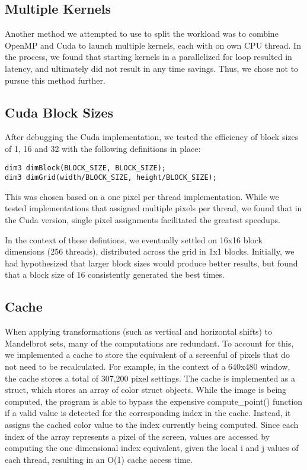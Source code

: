 \documentclass{article}
\begin{document}
\subsection{Multiple Kernels}

Another method we attempted to use to split the workload was to combine OpenMP and Cuda to launch multiple kernels, each with on own CPU thread. In the process, we found that starting kernels in a parallelized for loop resulted in latency, and ultimately did not result in any time savings. Thus, we chose not to pursue this method further.

\subsection{Cuda Block Sizes}

After debugging the Cuda implementation, we tested the efficiency of block sizes of 1, 16 and 32 with the following definitions in place: 

\begin{verbatim}
dim3 dimBlock(BLOCK_SIZE, BLOCK_SIZE); 
dim3 dimGrid(width/BLOCK_SIZE, height/BLOCK_SIZE);
\end{verbatim}

This was chosen based on a one pixel per thread implementation. While we tested implementations that assigned multiple pixels per thread, we found that in the Cuda version, single pixel assignments facilitated the greatest speedups. 

In the context of these defintions, we eventually settled on 16x16 block dimensions (256 threads), distributed across the grid in 1x1 blocks. Initially, we had hypothesized that larger block sizes would produce better results, but found that a block size of 16 consistently generated the best times. 

\subsection{Cache}

When applying transformations (such as vertical and horizontal shifts) to Mandelbrot sets, many of the computations are redundant. To account for this, we implemented a cache to store the equivalent of a screenful of pixels that do not need to be recalculated. For example, in the context of a 640x480 window, the cache stores a total of 307,200 pixel settings. The cache is implemented as a struct, which stores an array of color struct objects. While the image is being computed, the program is able to bypass the expensive compute\_point() function if a valid value is detected for the corresponding index in the cache. Instead, it assigns the cached color value to the index currently being computed. Since each index of the array represents a pixel of the screen, values are accessed by computing the one dimensional index equivalent, given the local i and j values of each thread, resulting in an O(1) cache access time. 
\end{document}
